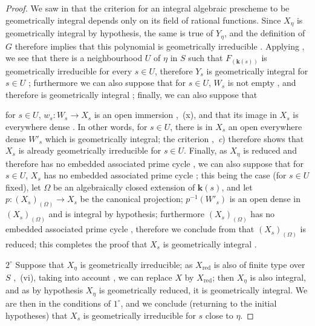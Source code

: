 \begin{proof}
We saw in  that the criterion for an integral algebraic prescheme to be geometrically integral depends only on its field of rational functions. Since $X_\eta$ is geometrically integral by hypothesis, the same is true of $Y_\eta$, and the definition of $G$ therefore implies that this polynomial is geometrically irreducible .
Applying , we see that there is a neighbourhood $U$ of $\eta$ in $S$ such that $F_{(\boldsymbol{k}(s))}$ is geometrically irreducible for every $s\in U$, therefore $Y_s$ is geometrically integral for $s\in U$ ; furthermore we can also suppose that for $s\in U$, $W_s$ is not empty , and therefore is geometrically integral ; finally, we can also suppose that


for $s\in U$, $w_s:W_s\to X_s$ is an open immersion ,~(x), and that its image in $X_s$ is everywhere dense .
In other words, for $s\in U$, there is in $X_s$ an open everywhere dense $W'_s$ which is geometrically integral; the criterion ,~\emph{c}) therefore shows that $X_s$ is already geometrically irreducible for $s\in U$.
Finally, as $X_\eta$ is reduced and therefore has no embedded associated prime cycle , we can also suppose that for $s\in U$, $X_s$ has no embedded associated prime cycle ; this being the case (for $s\in U$ fixed), let $\Omega$ be an algebraically closed extension of $\boldsymbol{k}(s)$, and let $p:(X_s)_{(\Omega)}\to X_s$ be the canonical projection; $p^{-1}(W'_s)$ is an open dense in $(X_s)_{(\Omega)}$  and is integral by hypothesis; furthermore $(X_s)_{(\Omega)}$ has no embedded associated prime cycle , therefore we conclude from  that $(X_s)_{(\Omega)}$ is reduced; this completes the proof that $X_s$ is geometrically integral .

$2^\circ$ Suppose that $X_\eta$ is geometrically irreducible; as $X_{\mathrm{red}}$ is also of finite type over $S$ ,~(vi), taking into account , we can replace $X$ by $X_{\mathrm{red}}$; then $X_\eta$ is also integral, and as by hypothesis $X_\eta$ is geometrically reduced, it is geometrically integral. We are then in the conditions of $1^\circ$, and we conclude (returning to the initial hypotheses) that $X_s$ is geometrically irreducible for $s$ close to $\eta$.


\end{proof}
